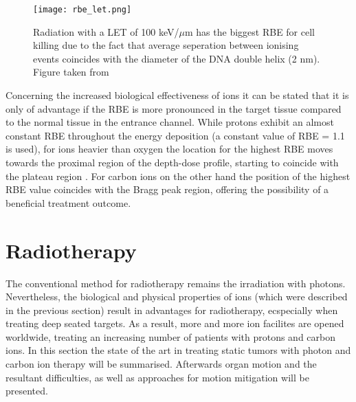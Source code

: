 \documentclass[type=dr, dr=rernat, accentcolor=tud7b,colorbacktitle, bigchapter, openright, twoside, 12pt ]{tudthesis}
\begin{document}

\begin{figure}[H]
\begin{center}
\texttt{[image: rbe\_let.png]}
\caption{Radiation with a LET of 100 keV/${\mu}$m has the biggest RBE for cell killing due to the fact that average seperation between 
ionising events coincides with the diameter of the DNA double helix (2 nm). Figure taken from \cite{Hal06}}
\label{rbe_let}
\end{center}
\end{figure}

Concerning the increased biological effectiveness of ions it can be stated that it is only of advantage if the RBE is more pronounced 
in the target tissue compared to the normal tissue in the entrance channel. While protons exhibit an almost constant RBE throughout the 
energy deposition (a constant value of RBE = 1.1 is used), for ions heavier than oxygen the location for the highest RBE moves towards the 
proximal region of the depth-dose profile, starting to coincide with the plateau region \cite{Kra00}. For carbon ions on the other hand 
the position of the highest RBE value coincides with the Bragg peak region, offering the possibility of a beneficial treatment outcome. 





\newpage


\section{Radiotherapy}

The conventional method for radiotherapy remains the irradiation with photons. Nevertheless, the biological and physical properties of ions 
(which were described in the previous section) result in advantages for radiotherapy, ecspecially when treating deep seated targets. 
As a result, more and more ion facilites are opened worldwide, treating an increasing number of patients with protons and carbon ions. 
In this section the state of the art in treating static tumors with photon and carbon ion therapy will be summarised. 
Afterwards organ motion and the resultant difficulties, as well as approaches for motion mitigation will be presented. 
\end{document}

